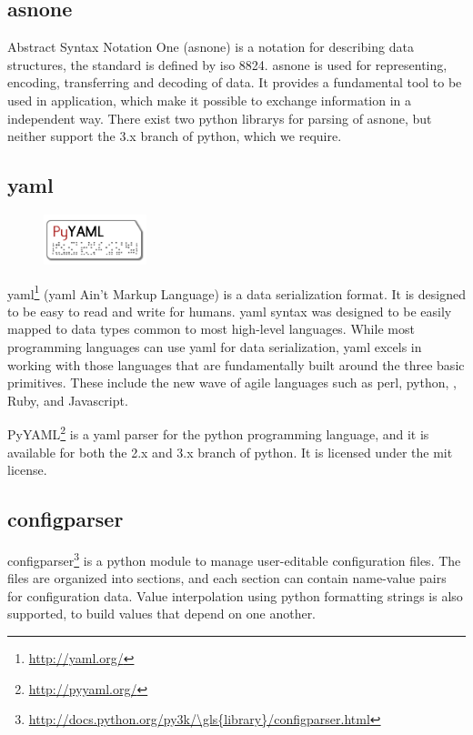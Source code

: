 \subsection{\gls{asnone}}
Abstract Syntax Notation One (\gls{asnone}) is a notation for describing data
structures, the standard is defined by \Gls{iso} 8824. \gls{asnone} is used for
representing, encoding, transferring and decoding of data. It provides a
fundamental tool to be used in application, which make it possible to exchange
information in a independent way. There exist two \Gls{python} \glspl{library} for parsing
of  \gls{asnone}, but neither support the 3.x \gls{branch} of \Gls{python}, which we require.

\subsection{\Gls{yaml}}
\label{sec:pre:yaml}
\begin{figure}
	\vspace{-30pt}
	\includegraphics[width=3cm]{./planning/img/pyyaml_logo}
	\vspace{-30pt}
\end{figure}
\Gls{yaml}\footnote{\url{http://yaml.org/}} (\Gls{yaml} Ain't Markup Language) is a \gls{data serialization} format.
It is designed to be easy to read and write for humans.
\Gls{yaml} syntax was designed to be easily mapped to data types common to most
high-level languages. While most programming languages can use \Gls{yaml} for data
serialization, \Gls{yaml} excels in working with those languages that are
fundamentally built around the three basic primitives. These include the new
wave of agile languages such as \Gls{perl}, \Gls{python}, , \Gls{Ruby}, and \Gls{Javascript}.

PyYAML\footnote{\url{http://pyyaml.org/}} is a \Gls{yaml} \gls{parser} for the \Gls{python}
programming language, and it is available for both the 2.x and 3.x \gls{branch} of
\Gls{python}. It is licensed under the \Gls{mit} license.

\subsection{configparser}
configparser\footnote{\url{http://docs.python.org/py3k/\gls{library}/configparser.html}}
is a \Gls{python} module to manage user-editable configuration files. The
files are organized into sections, and each section can contain name-value
pairs for configuration data. Value interpolation using \Gls{python} formatting
strings is also supported, to build values that depend on one another.

